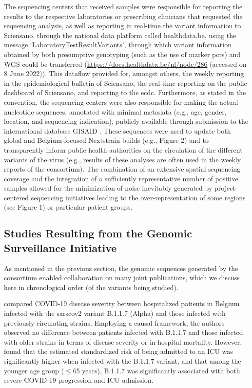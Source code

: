 The sequencing centers that received samples were responsible for reporting the results to the respective laboratories or prescribing clinicians that requested the sequencing analysis, as well as reporting in real-time the variant information to Sciensano, through the national data platform called healthdata.be, using the message `LaboratoryTestResultVariants', through which variant information obtained by both presumptive genotyping (such as the use of marker \gls{pcr}s) and WGS could be transferred (\url{https://docs.healthdata.be/nl/node/286} (accessed on 8 June 2022)).
This dataflow provided for, amongst others, the weekly reporting in the epidemiological bulletin of Sciensano, the real-time reporting on the public dashboard of Sciensano, and reporting to the \gls{ecdc}.
Furthermore, as stated in the convention, the sequencing centers were also responsible for making the actual nucleotide sequences, annotated with minimal metadata (e.g., age, gender, location, and sequencing indication), publicly available through submission to the international database GISAID \citep{shu2017gisaid}.
These sequences were used to update both global and Belgium-focused Nextstrain builds (e.g., Figure 2) and to transparently inform public health authorities on the circulation of the different variants of the virus (e.g., results of these analyses are often used in the weekly reports of the consortium).
The combination of an extensive spatial sequencing coverage and the integration of a sufficiently representative number of positive samples allowed for the minimization of noise inevitably generated by project-centered sequencing initiatives leading to the over-representation of some regions (see Figure 1) or particular patient groups.


\subsection{Studies Resulting from the Genomic Surveillance Initiative}
As mentioned in the previous section, the genomic sequences generated by the consortium enabled collaboration on many joint publications, which we discuss here in chronological order (of the variants being studied).

\citet{vangoethem2022severity} compared COVID-19 disease severity between hospitalized patients in Belgium infected with the \gls{sarscov2} variant B.1.1.7 (Alpha) and those infected with previously circulating strains.
Employing a causal framework, the authors observed no difference between patients infected with B.1.1.7 and those infected with older strains in terms of disease severity or in-hospital mortality.
However, \citet{vangoethem2022severity} found that the estimated standardized risk of being admitted to an ICU was significantly higher when infected with the B.1.1.7 variant, and that among the younger age group ($\leq$65 years), B.1.1.7 was significantly associated with both severe COVID-19 progression and ICU admission.

